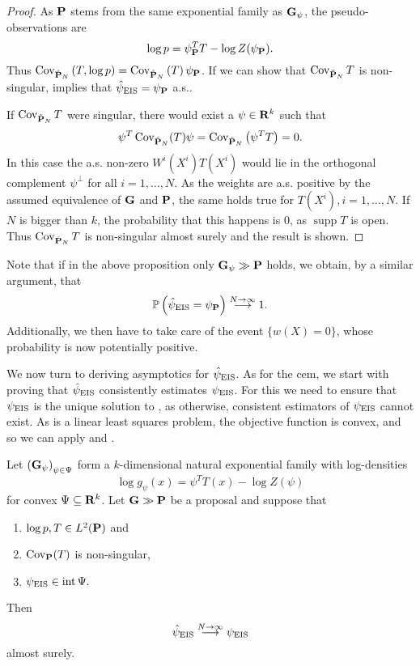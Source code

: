 \begin{proof}
   As $\P$ stems from the same exponential family as $\G_{\psi}$, the pseudo-observations are $$\log p  = \psi_{\P}^T T - \log Z(\psi_{\P}).$$ Thus $\cov_{\hat \P_{N}} \left( T, \log p  \right) = \cov_{\hat \P_{N}} \left( T \right)\psi_{\P}$. 
   If we can show that $\cov_{\hat\P_{N}} T$ is non-singular,  implies that $\hpeis = \psi_{\P}$ a.s.. 

   If $\cov_{\hat \P_{N}} T$ were singular, there would exist a $\psi \in \R^{k}$ such that
   $$
   \psi^{T} \cov_{\hat\P_{N}} (T) \psi = \cov_{\hat \P_{N}} \left( \psi^{T}T \right) = 0.
   $$
    In this case the a.s. non-zero $W^{i}(X^{i}) T(X^{i})$ would lie in the orthogonal complement $\psi^{\perp}$ for all $i = 1, \dots, N$. As the weights are a.s. positive by the assumed equivalence of $\G$ and $\P$, the same holds true for $T(X^{i}), i = 1,\dots, N$.
   If $N$ is bigger than $k$, the probability that this happens is $0$, as $\operatorname{supp} T $ is open. Thus $\cov_{\hat \P_{N}} T$ is non-singular almost surely and the result is shown.
\end{proof}

Note that if in the above proposition only $\G_{\psi} \gg \P$ holds, we obtain, by a similar argument, that $$\mathbb P \left( \hpeis = \psi_{\P} \right) \stackrel{N\to\infty}\longrightarrow 1.$$
Additionally, we then have to take care of the event $ \{ w(X) = 0 \}$, whose probability is now potentially positive.

We now turn to deriving asymptotics for $\hpeis$. As for the \acrshort{cem}, we start with proving that $\hpeis$ consistently estimates $\peis$.
For this we need to ensure that $\peis$ is the unique solution to , as otherwise, consistent estimators of $\peis$ cannot exist. 
As  is a linear least squares problem, the objective function is convex, and so we can apply  and .

\begin{theorem}
    \label{thm:eis-consistent}
    Let $\left( \G_{\psi} \right)_{\psi \in \Psi}$ form a $k$-dimensional natural exponential family with log-densities 
    $$
        \log g_{\psi}(x) = \psi^{T}T(x) - \log Z(\psi)
    $$
    for convex $\Psi \subseteq \R^{k}$. Let $\G \gg \P$ be a proposal and suppose that 
    \begin{enumerate}
        \item $\log p, T \in L^{2}(\P)$ and
        \item $\cov_\P (T)$ is non-singular,
        \item $\peis \in \operatorname{int} \Psi.$ 
    \end{enumerate}
    
    Then 
    $$
        \hpeis \stackrel{N \to \infty}\longrightarrow \peis
    $$
    almost surely.
\end{theorem}

